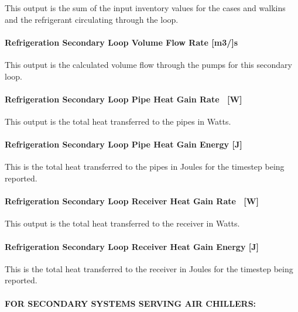 This output is the sum of the input inventory values for the cases and walkins and the refrigerant circulating through the loop.

\paragraph{Refrigeration Secondary Loop Volume Flow Rate {[}m3/{]}s}\label{refrigeration-secondary-loop-volume-flow-rate-m3s}

This output is the calculated volume flow through the pumps for this secondary loop.

\paragraph{Refrigeration Secondary Loop Pipe Heat Gain Rate~ {[}W{]}}\label{refrigeration-secondary-loop-pipe-heat-gain-rate-w}

This output is the total heat transferred to the pipes in Watts.

\paragraph{Refrigeration Secondary Loop Pipe Heat Gain Energy {[}J{]}}\label{refrigeration-secondary-loop-pipe-heat-gain-energy-j}

This is the total heat transferred to the pipes in Joules for the timestep being reported.

\paragraph{Refrigeration Secondary Loop Receiver Heat Gain Rate~ {[}W{]}}\label{refrigeration-secondary-loop-receiver-heat-gain-rate-w}

This output is the total heat transferred to the receiver in Watts.

\paragraph{Refrigeration Secondary Loop Receiver Heat Gain Energy {[}J{]}}\label{refrigeration-secondary-loop-receiver-heat-gain-energy-j}

This is the total heat transferred to the receiver in Joules for the timestep being reported.

\paragraph{FOR SECONDARY SYSTEMS SERVING AIR CHILLERS:}\label{for-secondary-systems-serving-air-chillers}

